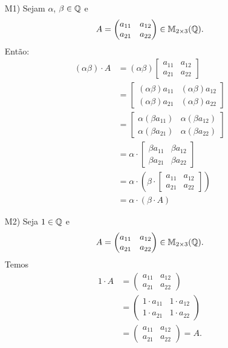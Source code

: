\documentclass[12pt]{exam}
\begin{document}
\begin{itemize}
        \item[M1)] Sejam $\alpha$, $\beta \in \mathbb{Q}$ e
        \[
        A = \begin{pmatrix} a_{11} & a_{12}\\a_{21} & a_{22}\end{pmatrix} \in \mathbb{M}_{2 \times 3}(\mathbb{Q}).
        \]
        Então:
        \begin{align*}
            (\alpha\beta)\cdot A & = (\alpha\beta)\begin{bmatrix} a_{11} & a_{12}\\a_{21} & a_{22}\end{bmatrix}
            \\ &= \begin{bmatrix} (\alpha\beta)a_{11} & (\alpha\beta)a_{12}\\(\alpha\beta)a_{21} & (\alpha\beta)a_{22}\end{bmatrix}
            \\ &= \begin{bmatrix} \alpha(\beta a_{11}) & \alpha(\beta a_{12})\\\alpha(\beta a_{21}) & \alpha(\beta a_{22})\end{bmatrix}
            \\ &= \alpha\cdot\begin{bmatrix} \beta a_{11} & \beta a_{12}\\\beta a_{21} & \beta a_{22}\end{bmatrix}
            \\ &= \alpha\cdot\left(\beta\cdot\begin{bmatrix} a_{11} & a_{12}\\a_{21} & a_{22}\end{bmatrix}\right)
            \\ &= \alpha\cdot(\beta\cdot A)
        \end{align*}

        \item[M2)] Seja $1 \in \mathbb{Q}$ e
        \[
        A = \begin{pmatrix} a_{11} & a_{12}\\a_{21} & a_{22}\end{pmatrix} \in \mathbb{M}_{2 \times 3}(\mathbb{Q}).
        \]
        Temos
        \begin{align*}
            1\cdot A & = \begin{pmatrix} a_{11} & a_{12}\\a_{21} & a_{22}\end{pmatrix}
            \\ &= \begin{pmatrix} 1\cdot a_{11} & 1\cdot a_{12}\\1\cdot a_{21} & 1\cdot a_{22}\end{pmatrix}
            \\ &= \begin{pmatrix} a_{11} & a_{12}\\a_{21} & a_{22}\end{pmatrix} = A.
        \end{align*}


\end{itemize}
\end{document}
